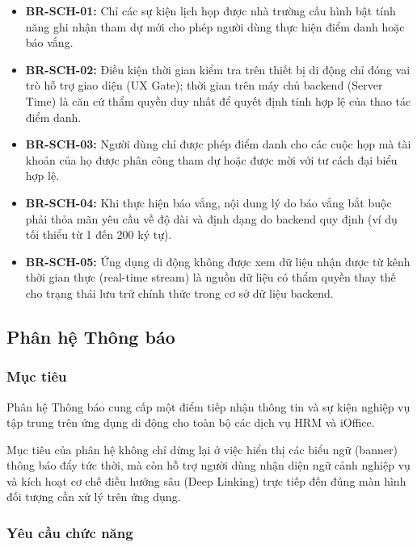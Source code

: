 \begin{itemize}[leftmargin=1.5cm]
    \item \textbf{BR-SCH-01:} Chỉ các sự kiện lịch họp được nhà trường cấu hình bật tính năng ghi nhận tham dự mới cho phép người dùng thực hiện điểm danh hoặc báo vắng.
    \item \textbf{BR-SCH-02:} Điều kiện thời gian kiểm tra trên thiết bị di động chỉ đóng vai trò hỗ trợ giao diện (UX Gate); thời gian trên máy chủ backend (Server Time) là căn cứ thẩm quyền duy nhất để quyết định tính hợp lệ của thao tác điểm danh.
    \item \textbf{BR-SCH-03:} Người dùng chỉ được phép điểm danh cho các cuộc họp mà tài khoản của họ được phân công tham dự hoặc được mời với tư cách đại biểu hợp lệ.
    \item \textbf{BR-SCH-04:} Khi thực hiện báo vắng, nội dung lý do báo vắng bắt buộc phải thỏa mãn yêu cầu về độ dài và định dạng do backend quy định (ví dụ tối thiểu từ 1 đến 200 ký tự).
    \item \textbf{BR-SCH-05:} Ứng dụng di động không được xem dữ liệu nhận được từ kênh thời gian thực (real-time stream) là nguồn dữ liệu có thẩm quyền thay thế cho trạng thái lưu trữ chính thức trong cơ sở dữ liệu backend.
\end{itemize}

\subsection{Phân hệ Thông báo}
\label{subsec:req_notification}

\subsubsection{Mục tiêu}
Phân hệ Thông báo cung cấp một điểm tiếp nhận thông tin và sự kiện nghiệp vụ tập trung trên ứng dụng di động cho toàn bộ các dịch vụ HRM và iOffice.

Mục tiêu của phân hệ không chỉ dừng lại ở việc hiển thị các biểu ngữ (banner) thông báo đẩy tức thời, mà còn hỗ trợ người dùng nhận diện ngữ cảnh nghiệp vụ và kích hoạt cơ chế điều hướng sâu (Deep Linking) trực tiếp đến đúng màn hình đối tượng cần xử lý trên ứng dụng.

\subsubsection{Yêu cầu chức năng}

